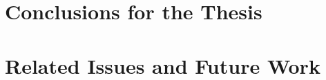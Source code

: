 \section{Conclusions for the Thesis}
\label{conclusions:thesis}


\section{Related Issues and Future Work}
\label{conclusions:future}
